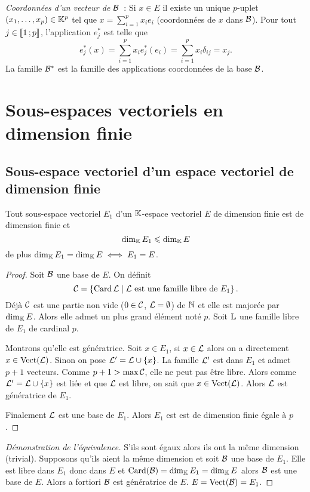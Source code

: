 \emph{Coordonnées d'un vecteur de \(\mathcal{B}\)}~: Si \(x \in E\) il existe un unique
\(p\)-uplet \((x_1, \ldots, x_p) \in \mathbb{K}^p\) tel que \(x = \sum_{i=1}^p x_i e_i\)
(coordonnées de \(x\) dans \(\mathcal{B}\)). Pour tout \(j \in
\mathopen{\llbracket}1\mathclose{}\mathpunct{};p\mathclose{\rrbracket}\), l'application \(e_j^*\) est telle que
\begin{equation}
  e_j^*(x)=\sum_{i=1}^p x_i e_j^*(e_i) = \sum_{i=1}^p x_i \delta_{ij} = x_j.
\end{equation}
La famille \(\mathcal{B}^*\) est la famille des applications coordonnées de la base
\(\mathcal{B}\).

\section{Sous-espaces vectoriels en dimension finie}

\subsection{Sous-espace vectoriel d'un espace vectoriel de dimension finie}

\begin{theo}
  Tout sous-espace vectoriel \(E_1\) d'un \(\mathbb{K}\)-espace vectoriel \(E\) de
  dimension finie est de dimension finie et
  \begin{equation}
    \operatorname{dim}_{\mathbb{K}} E_1 \leqslant \operatorname{dim}_{\mathbb{K}} E
  \end{equation}
  de plus \(\operatorname{dim}_{\mathbb{K}} E_1 = \operatorname{dim}_{\mathbb{K}} E \iff E_1 =E\).
\end{theo}
\begin{proof}
  Soit \(\mathcal{B}\) une base de \(E\). On définit \begin{equation}
  \mathcal{C}=\left\{\operatorname{Card} \mathcal{L}\mathrel{}\middle|\mathrel{}\mathcal{L} \text{~est une famille libre de } E_1\right\}.
  \end{equation}
  Déjà \(\mathcal{C}\) est une partie non vide (\(0 \in \mathcal{C}\),
  \(\mathcal{L}=\emptyset\)) de \(\mathbb{N}\) et elle est majorée par \(\operatorname{dim}_{\mathbb{K}} E\). Alors elle
  admet un plus grand élément noté \(p\). Soit \(\mathbb{L}\) une famille libre de
  \(E_1\) de cardinal \(p\).

  Montrons qu'elle est génératrice. Soit \(x \in E_1\), si \(x \in \mathcal{L}\) alors
  on a directement \(x \in \operatorname{Vect}(\mathcal{L})\). Sinon on pose \(\mathcal{L}' = \mathcal{L} \cup
  \{x\}\). La famille \(\mathcal{L}'\) est dans \(E_1\) et admet \(p+1\) vecteurs. Comme
  \(p+1 > \max \mathcal{C}\), elle ne peut pas être libre. Alors comme \(\mathcal{L}'
  =\mathcal{L}\cup\{x\}\) est liée et que \(\mathcal{L}\) est libre, on sait que \(x \in
  \operatorname{Vect}(\mathcal{L})\). Alors \(\mathcal{L}\) est génératrice de \(E_1\).

  Finalement \(\mathcal{L}\) est une base de \(E_1\). Alors \(E_1\) est est de dimension
  finie égale à \(p\).
\end{proof}
\begin{proof}[Démonstration de l'équivalence]
  S'ils sont égaux alors ils ont la même dimension (trivial). Supposons qu'ils
  aient la même dimension et soit \(\mathcal{B}\) une base de \(E_1\). Elle est libre
  dans \(E_1\) donc dans \(E\) et \(\operatorname{Card}(\mathcal{B})=\operatorname{dim}_{\mathbb{K}} E_1=\operatorname{dim}_{\mathbb{K}} E\) alors
  \(\mathcal{B}\) est une base de \(E\). Alors a fortiori \(\mathcal{B}\) est génératrice de
  \(E\). \(E=\operatorname{Vect}(\mathcal{B})=E_1\).
\end{proof}

